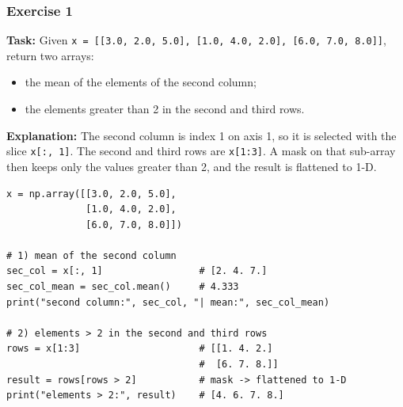\subsubsection{Exercise 1}
\textbf{Task:} Given \texttt{x = [[3.0, 2.0, 5.0], [1.0, 4.0, 2.0], [6.0, 7.0, 8.0]]}, return two arrays:
\begin{itemize}
    \item the mean of the elements of the second column;
    \item the elements greater than 2 in the second and third rows.
\end{itemize}

\textbf{Explanation:} The second column is index 1 on axis 1, so it is selected with the slice \texttt{x[:, 1]}. The second and third rows are \texttt{x[1:3]}. A mask on that sub-array then keeps only the values greater than 2, and the result is flattened to 1-D.

\begin{lstlisting}[caption={Slicing a column, slicing rows and applying a mask.}]
x = np.array([[3.0, 2.0, 5.0],
              [1.0, 4.0, 2.0],
              [6.0, 7.0, 8.0]])

# 1) mean of the second column
sec_col = x[:, 1]                 # [2. 4. 7.]
sec_col_mean = sec_col.mean()     # 4.333
print("second column:", sec_col, "| mean:", sec_col_mean)

# 2) elements > 2 in the second and third rows
rows = x[1:3]                     # [[1. 4. 2.]
                                  #  [6. 7. 8.]]
result = rows[rows > 2]           # mask -> flattened to 1-D
print("elements > 2:", result)    # [4. 6. 7. 8.]
\end{lstlisting}
